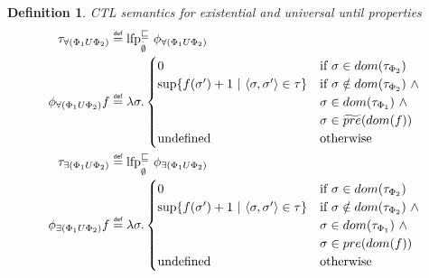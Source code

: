 \documentclass[11pt,a4paper,titlepage]{article}
\newtheorem{definition}{Definition}[section]
\newcommand\eqdef{\mathrel{\overset{\makebox[0pt]{\mbox{\normalfont\tiny\sffamily def}}}{=}}}
\begin{document}
\begin{definition}\label{def:ctl_semantics_until}
    CTL semantics for existential and universal until properties
    \setlength{\jot}{15pt}
    \begin{align}
        \tau_{\forall(\Phi_1 U \Phi_2)}  &\eqdef \text{lfp}_{\overset{.}{\emptyset}}^{\sqsubseteq} \ \phi_{\forall(\Phi_1 U \Phi_2)}\\
        \phi_{\forall(\Phi_1 U \Phi_2)}f &\eqdef \lambda \sigma.
        \begin{cases}
            0                                                           
                & \text{if} \ \sigma \in dom(\tau_{\Phi_2}) \\
            \sup\{ f(\sigma') + 1 \ | \ \langle \sigma,\sigma' \rangle \in \tau \}    
                & \text{if} \ \sigma \notin dom(\tau_{\Phi_2}) \ \land \\ 
                & \sigma \in dom(\tau_{\Phi_1}) \ \land \\ 
                & \sigma \in \widetilde{pre}(dom(f)) \\
            \text{undefined}                                            
                & \text{otherwise}
        \end{cases}\\
        \tau_{\exists(\Phi_1 U \Phi_2)}  &\eqdef \text{lfp}_{\overset{.}{\emptyset}}^{\sqsubseteq} \ \phi_{\exists(\Phi_1 U \Phi_2)}\\
        \phi_{\exists(\Phi_1 U \Phi_2)}f &\eqdef \lambda \sigma.
        \begin{cases}
            0                                                           
                & \text{if} \ \sigma \in dom(\tau_{\Phi_2}) \\
            \sup\{ f(\sigma') + 1 \ | \ \langle \sigma,\sigma' \rangle \in \tau \}    
                & \text{if} \ \sigma \notin dom(\tau_{\Phi_2}) \ \land \\ 
                & \sigma \in dom(\tau_{\Phi_1}) \ \land \\ 
                & \sigma \in pre(dom(f)) \\
            \text{undefined}                                            
                & \text{otherwise}
        \end{cases}
    \end{align}
\end{definition}
\end{document}

